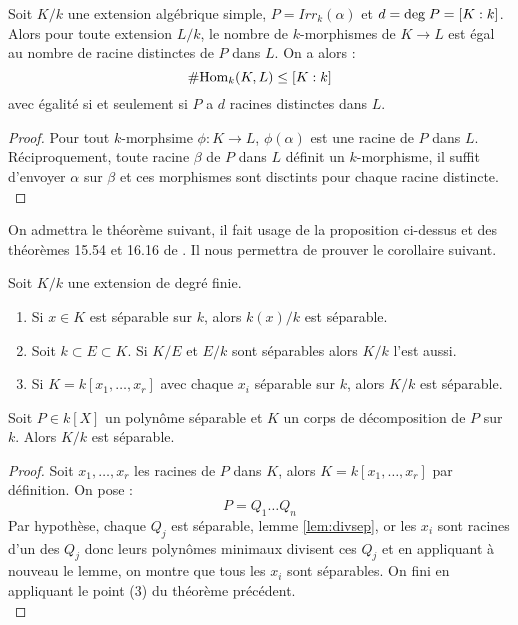 \documentclass[a4paper]{article} %
\numberwithin{section}{part}
\numberwithin{equation}{section}
\begin{document}
\begin{prop}
Soit $K/k$ une extension algébrique simple, $P = Irr_k(\alpha)$ et $d =
\textup{deg\;}P = [K:k]$. Alors pour toute extension $L/k$, le nombre de
$k$-morphismes de $K \to L$ est égal au nombre de racine distinctes de $P$ dans
$L$. On a alors :
\[\#\textup{Hom}_k(K,L)\leq[K:k]\]
avec égalité si et seulement si $P$ a $d$ racines distinctes dans $L$.
\end{prop}
\begin{proof}
Pour tout $k$-morphsime $\phi : K\to L$, $\phi(\alpha)$ est une racine de $P$
dans $L$. Réciproquement, toute racine $\beta$ de $P$ dans $L$ définit un
$k$-morphisme, il suffit d'envoyer $\alpha$ sur $\beta$ et ces morphismes sont
disctints pour chaque racine distincte.\\
\end{proof}

On admettra le théorème suivant, il fait usage de la proposition ci-dessus et
des théorèmes 15.54 et 16.16 de \cite[Chap. VIII]{Pol}. Il nous permettra de
prouver le corollaire suivant.

\begin{thm}
Soit $K/k$ une extension de degré finie. 

\begin{enumerate}[(1)]
\item Si $x\in K$ est séparable sur $k$, alors $k(x)/k$ est séparable.

\item Soit $k \subset E \subset K$. Si $K/E$ et $E/k$ sont séparables alors
$K/k$ l'est aussi.

\item Si $K = k[x_1,\dots,x_r]$ avec chaque $x_i$ séparable sur $k$, alors $K/k$
est séparable.
\end{enumerate}
\end{thm}

\begin{cor}
Soit $P\in k[X]$ un polynôme séparable et $K$ un corps de
décomposition de $P$ sur $k$. Alors $K/k$ est séparable.
\end{cor}
\begin{proof}
Soit $x_1,\dots,x_r$ les racines de $P$ dans $K$, alors $K = k[x_1,\dots,x_r]$
par définition. On pose :
\[P = Q_1\dots Q_n\]
Par hypothèse, chaque $Q_j$ est séparable, lemme \ref{lem:divsep}, or les $x_i$ 
sont racines d'un des $Q_j$ donc leurs polynômes minimaux divisent ces $Q_j$ et 
en appliquant à nouveau le lemme, on montre que tous les $x_i$ sont séparables. 
On fini en appliquant le point (3) du théorème précédent.\\
\end{proof}
\end{document}
